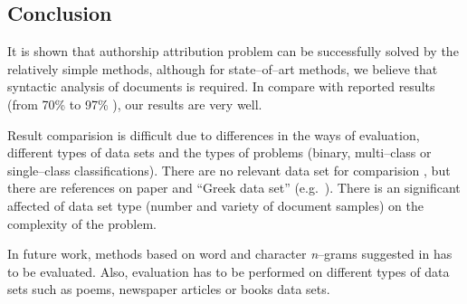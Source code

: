 \documentclass[11pt,english]{article}
\begin{document}
\begin{multicols}{2}
\section{Conclusion}
It is shown that authorship attribution problem can be successfully solved by
the relatively simple methods, although for state--of--art methods, we
believe that syntactic analysis of documents is required. In compare with
reported results (from 70\% to 97\%
\citep{coyotl2006authorship,keselj2003n,luyckx2005shallow,stamatatos2001computer,stamatatos1999automatic}),
our results are very well.

Result comparision is difficult due to differences in the ways of evaluation,
different types of data sets and the types of problems (binary, multi--class or
single--class classifications). There are no relevant data set for comparision
\citep{zhao2005effective}, but there are references on paper
\citep{stamatatos2001computer,stamatatos1999automatic} and ``Greek data set''
(e.g.\ \citep{keselj2003n}). There is an significant affected of data set type
(number and variety of document samples) on the complexity of the problem.

In future work, methods based on word and character \emph{n}--grams suggested
in \citep{keselj2003n,peng2003language,coyotl2006authorship} has to be
evaluated. Also, evaluation has to be performed on different types of data sets
such as poems, newspaper articles or books data sets.




\end{multicols}
\end{document}

